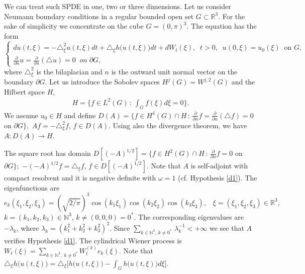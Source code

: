 \documentclass[preprint]{imsart}
\def\N{\mathbb N}
\def\R{\mathbb R}
\begin{document}
 We can treat  such SPDE in one, two or three dimensions. Let us  consider   Neumann boundary conditions in a regular bounded open set $G \subset \R^3$. For the sake of simplicity we concentrate on the cube $G = (0, \pi)^3$.
  The equation has the  form 
 \begin{equation} \label{all}\begin{cases}
d u (t, \xi)= -  \triangle^2_{\xi} u(t, \xi)dt + \triangle_\xi {   h( }u(t, \xi))dt + dW_t(\xi), \;\;t>0,\;\;  u(0, \xi) = u_0(\xi)\;\; \text{on $G$}, 
\\
\frac{\partial}{\partial n} u = \frac{\partial}{\partial n} (\triangle u) =0 \;\; on \; \partial G,
\end{cases}
\end{equation}    
 where $\triangle_{\xi}^2 $ is the bilaplacian and $n$    is the outward unit normal vector on the boundary $\partial G$.  Let us introduce the Sobolev spaces $H^j(G) = W^{j,2}(G)$ and the Hilbert space $H$,
 $$
 \begin{array}{l} 
 H = \big \{ f \in L^2 (G) \, :\, \int_G f(\xi) d\xi =0 \big \}.
 \end{array} 
 $$
 We assume $u_0 \in H$ and  define $ D(A) = \{ f \in H^4 (G) \cap H \, :\,  \frac{\partial}{\partial n} f = \frac{\partial}{\partial n} (\triangle f) =0 $    on $ \partial G \big \}, $ $A f = - \triangle^2_{\xi} f$, $f \in D(A)$. Using also the divergence theorem, we have $A : D(A) \to H$.
 
 The square root has domain $D[(-A)^{1/2}]   = \{ f \in H^2 (G) \cap H \, :\,  \frac{\partial}{\partial n} f  =0 $  on $ \partial G\big \};$ $- (-A)^{1/2} f = \triangle_{\xi} f$, $f \in D[(-A)^{1/2}]$. 
 Note that 
 $A$   is self-adjoint with compact resolvent  and it is   negative definite with $\omega =1$ (cf. Hypothesis \ref{d1}). 
  The
eigenfunctions are
 $$
 e_k (\xi_1, \xi_2, \xi_3) = (\sqrt{2/\pi})^3 \cos (k_1 \xi_1) \cos (k_2\xi_2)
 \cos(k_3 \xi_3), \;\;\; \xi = (\xi_1, \xi_2, \xi_3) \in
 \R^3,  $$
 $k=(k_1, k_2, k_3) \in
 \N^3$, $k \not = (0,0,0)= 0^*$.
 The corresponding  eigenvalues  
 are $-\lambda_k$, where $\lambda_k =  (k_1^2 + k_2^2 + k_3^2 )^2$.
 Since $\sum_{k  \in \N^3, \, k \not = 0^*} \, \lambda_k^{-1} < + \infty 
 $  we see that $A$ verifies Hypothesis \ref{d1}. 
The cylindrical Wiener process  is     $W_t(\xi) = \sum_{k \in \N^3,\; k \not = 0^*}  
   W_t^{(k)} e_k(\xi)$. 
   Note that  $\triangle_\xi {   h( }u(t, \xi)) =  \triangle_\xi \big [ 
  {   h( }u(t, \xi)) - \int_G  {   h( }u(t,\xi))d\xi\big] $.
     
\end{document}
